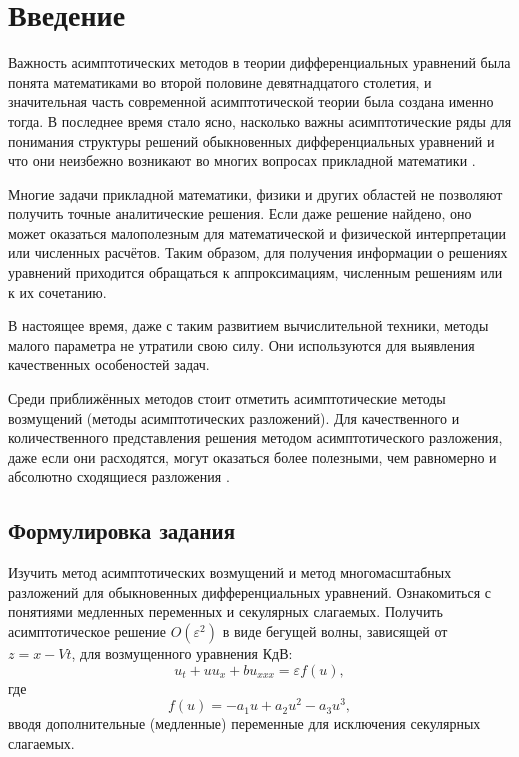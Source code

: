 \chapter*{Введение}

Важность асимптотических методов
в теории дифференциальных уравнений
была понята математиками
во второй половине девятнадцатого столетия,
и значительная часть современной асимптотической теории
была создана именно тогда.
В последнее время стало ясно,
насколько важны асимптотические ряды
для понимания структуры решений обыкновенных дифференциальных уравнений
и что они неизбежно возникают во многих вопросах прикладной математики
\cite{vazov1968}.

Многие задачи прикладной математики, физики и других областей
не позволяют получить точные аналитические решения.
Если даже решение найдено,
оно может оказаться малополезным для
математической и физической интерпретации
или численных расчётов.
Таким образом, для получения информации
о решениях уравнений приходится
обращаться к аппроксимациям,
численным решениям или к их сочетанию.

В настоящее время, даже с таким развитием
вычислительной техники,
методы малого параметра не утратили свою силу.
Они используются для выявления качественных особеностей задач.

Среди приближённых методов
стоит отметить асимптотические методы возмущений
(методы асимптотических разложений).
Для качественного и количественного представления
решения методом асимптотического разложения,
даже если они расходятся,
могут оказаться более полезными,
чем равномерно и абсолютно сходящиеся разложения
\cite{nayfeh1977}.

\section*{Формулировка задания}

Изучить метод асимптотических возмущений
и метод многомасштабных разложений
для обыкновенных дифференциальных уравнений.
Ознакомиться с понятиями медленных переменных
и секулярных слагаемых.
Получить асимптотическое решение  $O(\varepsilon^2)$
в виде бегущей волны, зависящей от $z=x-Vt$,
для возмущенного уравнения КдВ:
\begin{equation*}
    u_t + u u_x + b u_{xxx} = \varepsilon f(u),
\end{equation*}
где
\begin{equation*}
    f(u) = - a_1 u + a_2 u^2 - a_3 u^3,
\end{equation*}
вводя дополнительные (медленные) переменные
для исключения секулярных слагаемых.

